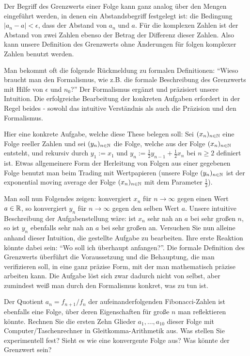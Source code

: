 \begin{bem}
	Der Begriff des Grenzwerts einer Folge kann ganz analog über den Mengen eingeführt werden, in denen ein Abstandsbegriff festgelegt ist: die Bedingung $|a_n - a| < \epsilon$, dass der Abstand von $a_n$ und $a$. Für die komplexen Zahlen ist der Abstand von zwei  Zahlen ebenso der Betrag der Differenz dieser Zahlen. Also kann unsere Definition des Grenzwerts ohne Änderungen für folgen komplexer Zahlen benutzt werden. 
\end{bem} 

\begin{bem} 
	Man bekommt oft die folgende Rückmeldung zu formalen Definitionen: 
	``Wieso braucht man den Formalismus, wie z.B. die formale Beschreibung des Grenzwerts mit Hilfe von $\epsilon$ und $n_0$?'' Der Formalismus ergänzt und präzisiert unsere Intuition. Die erfolgreiche Bearbeitung der konkreten Aufgaben erfordert in der Regel beides - sowohl das intuitive Verständnis als auch die Präzision und den Formalismus. 
	
	Hier eine konkrete Aufgabe, welche diese These belegen soll: Sei $(x_n)_{n \in \mathbb{N}}$ eine Folge reeller Zahlen und sei $(y_n)_{n \in \mathbb{N}}$ die Folge, welche aus der Folge $(x_n)_{n \in \mathbb{N}}$ entsteht, und rekursiv durch $y_1 := x_1$ und $y_n := \frac{1}{2} y_{n-1} + \frac{1}{2} x_n$ bei $n \ge 2$ definiert ist. Etwas allgemeinere Form der Herleitung von Folgen aus einer gegebenen Folge benutzt man beim Trading mit Wertpapieren (unsere Folge $(y_n)_{n \in \mathbb{N}}$ ist der exponential moving average der Folge $(x_n)_{n \in \mathbb{N}}$ mit dem Parameter $\frac{1}{2}$). 
	
	Man soll nun Folgendes zeigen: konvergiert $x_n$ für $n \to \infty$ gegen einen Wert $a \in \mathbb{R}$, so konvergiert $y_n$ für $n \to \infty$ gegen den selben Wert $a$. Unsere intuitive Beschreibung der Aufgabenstellung wäre: ist $x_n$ sehr nah an $a$ bei sehr großen $n$, so ist $y_n$ ebenfalls sehr nah an $a$ bei sehr großen an. Versuchen Sie nun alleine anhand dieser Intuition, die gestellte Aufgabe zu bearbeiten. Ihre erste Reaktion könnte dabei sein: ``Wo soll ich überhaupt anfangen?''. Die formale Definition des Grenzwerts überführt die Voraussetzung und die Behauptung, die man verifizieren soll, in eine ganz präzise Form, mit der man mathematisch präzise arbeiten kann. Die Aufgabe löst sich zwar dadurch nicht von selbst, aber zumindest weiß man durch den Formalismus konkret, was zu tun ist. 
\end{bem}

\begin{aufg}
Der Quotient $a_n = f_{n+1} / f_n$ der aufeinanderfolgenden Fibonacci-Zahlen ist ebenfalls eine Folge, über deren Eigenschaften für große $n$ man reflektieren könnte. Rechnen Sie die ersten Zehn Glieder $a_1,\ldots,a_{10}$ dieser Folge mit Computer/Taschenrechner in Gleitkomma-Arithmetik aus. Was stellen Sie experimentell fest? Sieht es wie eine konvergente Folge aus? Was könnte der Grenzwert sein? 
\end{aufg} 

